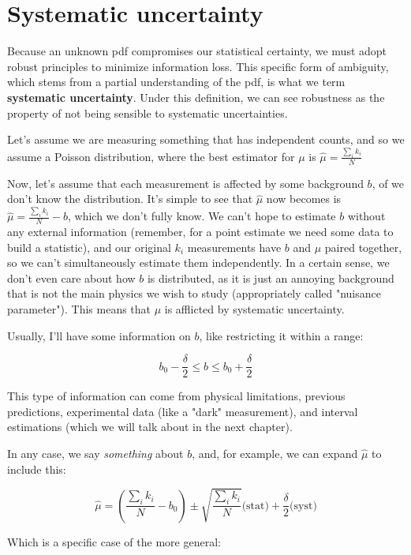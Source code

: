 \section{Systematic uncertainty}

Because an unknown pdf compromises our statistical certainty, we must adopt robust principles to minimize information loss. This specific form of ambiguity, which stems from a partial understanding of the pdf, is what we term \textbf{systematic uncertainty}. Under this definition, we can see robustness as the property of not being sensible to systematic uncertainties. 

Let's assume we are measuring something that has independent counts, and so we assume a Poisson distribution, where the best estimator for $\mu$ is $\hat\mu = \frac{\sum_i k_i}{N}$ 

Now, let's assume that each measurement is affected by some background $b$, of we don't know the distribution. It's simple to see that $\hat\mu$ now becomes is $\hat\mu = \frac{\sum_i k_i}{N}-b$, which we don't fully know. We can't hope to estimate $b$ without any external information (remember, for a point estimate we need some data to build a statistic), and our original $k_i$ measurements have $b$ and $\mu$ paired together, so we can't simultaneously estimate them independently. In a certain sense, we don't even care about how $b$ is distributed, as it is just an annoying background that is not the main physics we wish to study (appropriately called "nuisance parameter"). This means that $\mu$ is afflicted by systematic uncertainty. 

Usually, I'll have some information on $b$, like restricting it within a range:

	\[
	b_0 - \frac{\delta}{2} \leq b \leq b_0 + \frac{\delta}{2}
	\]

This type of information can come from physical limitations, previous predictions, experimental data (like a "dark" measurement), and interval estimations (which we will talk about in the next chapter). 

In any case, we say \emph{something} about $b$, and, for example, we can expand $\hat\mu$ to include this:

	\[
	\hat\mu = \left(\frac{\sum_i k_i}{N}-b_0\right)\pm \sqrt{\frac{\sum_i k_i}{N}}\text{(stat)} + \frac{\delta}{2}\text{(syst)} 
	\]

Which is a specific case of the more general:

